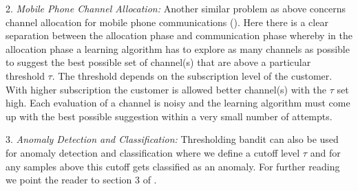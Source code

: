 	2. \emph{Mobile Phone Channel Allocation:} Another similar problem as above concerns channel allocation for mobile phone communications (\cite{audibert2009exploration}). Here there is a clear separation between the allocation phase and communication phase whereby in the allocation phase a learning algorithm has to explore as many channels as possible to suggest the best possible set of channel(s) that are above a particular threshold $\tau$. The threshold depends on the subscription level of the customer. With higher subscription the customer is allowed better channel(s) with the $\tau$ set high. Each evaluation of a channel is noisy and the learning algorithm must come up with the best possible suggestion within a very small  number of attempts.

	3. \emph{Anomaly Detection and Classification:} Thresholding bandit can also be used for anomaly detection and classification where we define a cutoff level $\tau$ and for any samples above this cutoff gets classified as an anomaly. For further reading we point the reader to section 3 of \cite{locatelli2016optimal}.

